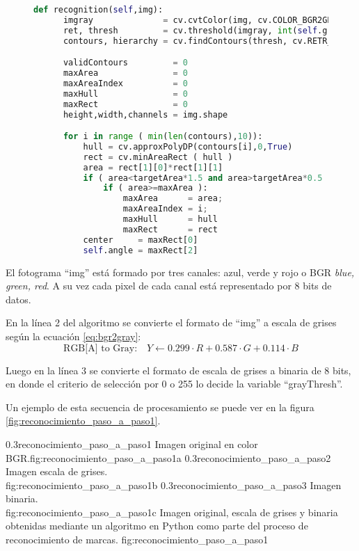 \begin{figure}[h]
   \begin{lstlisting}[language=python,caption={Algoritmo principal de reconocimiento de marcas en un fotograma},label={cod:reconocimiento2}]
def recognition(self,img):
      imgray              = cv.cvtColor(img, cv.COLOR_BGR2GRAY)
      ret, thresh         = cv.threshold(imgray, int(self.grayThresh), 0xff, cv.THRESH_BINARY_INV)
      contours, hierarchy = cv.findContours(thresh, cv.RETR_EXTERNAL, cv.CHAIN_APPROX_SIMPLE)

      validContours         = 0
      maxArea               = 0
      maxAreaIndex          = 0
      maxHull               = 0
      maxRect               = 0
      height,width,channels = img.shape

      for i in range ( min(len(contours),10)):
          hull = cv.approxPolyDP(contours[i],0,True) 
          rect = cv.minAreaRect ( hull )
          area = rect[1][0]*rect[1][1]
          if ( area<targetArea*1.5 and area>targetArea*0.5 ):
              if ( area>=maxArea ):
                  maxArea      = area;
                  maxAreaIndex = i;
                  maxHull      = hull
                  maxRect      = rect
          center     = maxRect[0]
          self.angle = maxRect[2]
   \end{lstlisting}
\end{figure}

El fotograma ``img'' está formado por tres canales: azul, verde y rojo o BGR \textit{blue, green, red}.
A su vez cada pixel de cada canal está representado por 8 bits de datos. \par
En la línea 2 del algoritmo se convierte el formato de ``img'' a escala de grises según la ecuación \ref{eq:bgr2gray}:
\begin{equation}
   \text{RGB[A] to Gray:} \quad Y \leftarrow 0.299 \cdot R + 0.587 \cdot G + 0.114 \cdot B
   \label{eq:bgr2gray}
\end{equation}

  Luego en la línea 3 se convierte el formato de escala de grises a binaria de 8 bits, en donde el criterio de selección por 0 o 255 lo decide la variable ``grayThresh''.\par
  Un ejemplo de esta secuencia de procesamiento se puede ver en la figura \ref{fig:reconocimiento_paso_a_paso1}.

\subfigabc
         {0.3}{reconocimiento_paso_a_paso1} {Imagen original en color BGR.}{fig:reconocimiento_paso_a_paso1a}
         {0.3}{reconocimiento_paso_a_paso2} {Imagen escala de grises. \\ \vphantom{1}}{fig:reconocimiento_paso_a_paso1b}
         {0.3}{reconocimiento_paso_a_paso3} {Imagen binaria.\\ \vphantom{1}}{fig:reconocimiento_paso_a_paso1c}
         {Imagen original, escala de grises y binaria obtenidas mediante un algoritmo en Python como parte del proceso de reconocimiento de marcas.}
         {fig:reconocimiento_paso_a_paso1}

